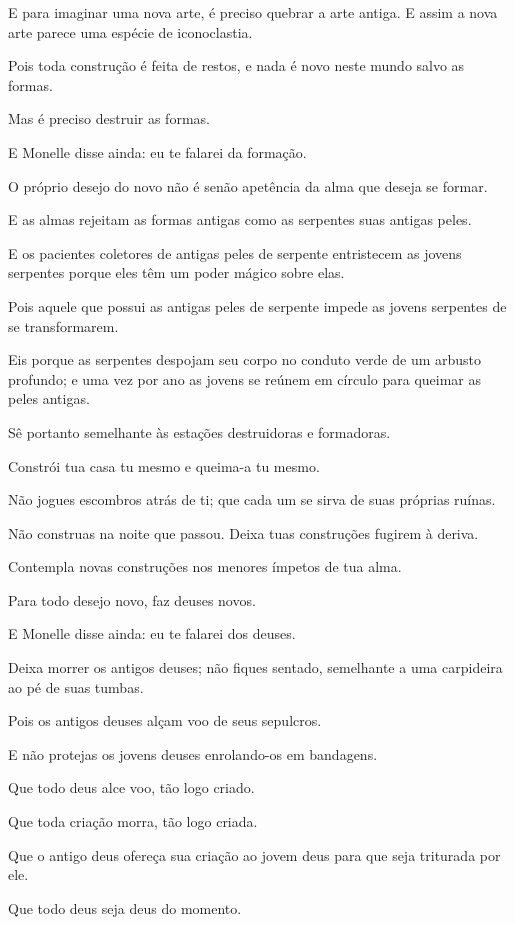 E para imaginar uma nova arte, é preciso quebrar a arte antiga. E assim
a nova arte parece uma espécie de iconoclastia.

Pois toda construção é feita de restos, e nada é novo neste mundo salvo
as formas.

Mas é preciso destruir as formas.

E Monelle disse ainda: eu te falarei da formação.

O próprio desejo do novo não é senão apetência da alma que deseja se
formar.

E as almas rejeitam as formas antigas como as serpentes suas antigas
peles.

E os pacientes coletores de antigas peles de serpente entristecem as
jovens serpentes porque eles têm um poder mágico sobre elas.

Pois aquele que possui as antigas peles de serpente impede as jovens
serpentes de se transformarem.

Eis porque as serpentes despojam seu corpo no conduto verde de um
arbusto profundo; e uma vez por ano as jovens se reúnem em círculo para
queimar as peles antigas.

Sê portanto semelhante às estações destruidoras e formadoras.

Constrói tua casa tu mesmo e queima-a tu mesmo.

Não jogues escombros atrás de ti; que cada um se sirva de suas próprias
ruínas.

Não construas na noite que passou. Deixa tuas construções fugirem à
deriva.

Contempla novas construções nos menores ímpetos de tua alma.

Para todo desejo novo, faz deuses novos.

E Monelle disse ainda: eu te falarei dos deuses.

Deixa morrer os antigos deuses; não fiques sentado, semelhante a uma
carpideira ao pé de suas tumbas.

Pois os antigos deuses alçam voo de seus sepulcros.

E não protejas os jovens deuses enrolando-os em bandagens.

Que todo deus alce voo, tão logo criado.

Que toda criação morra, tão logo criada.

Que o antigo deus ofereça sua criação ao jovem deus para que seja
triturada por ele.

Que todo deus seja deus do momento.


